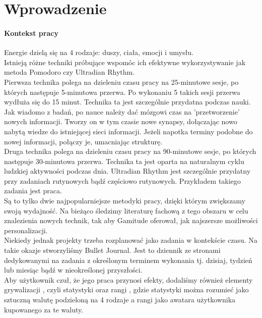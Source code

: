 \documentclass[a4paper,11pt]{report}
\begin{document}
\chapter{Wprowadzenie}
\subsubsection{Kontekst pracy}
Energie\cite{Harward} dzielą się na 4 rodzaje: duszy, ciała, emocji i umysłu.
\\Istnieją różne techniki próbujące wspomóc ich efektywne wykorzystywanie jak metoda Pomodoro\cite{Pomodoro}\cite{pomodoro_} czy Ultradian Rhythm\cite{90/30}\cite{ultradianRhytm1}\cite{ultradianRhytm2}\cite{ultradianRhytm3}.
\\Pierwsza technika polega na dzieleniu czasu pracy na 25-minutowe sesje, po których następuje 5-minutowa przerwa.
 Po wykonaniu 5 takich sesji przerwa wydłuża się do 15 minut.
 Technika ta jest szczególnie przydatna podczas nauki.
\\Jak wiadomo z badań, po nauce należy dać mózgowi czas na 'przetworzenie' nowych informacji.
 Tworzy on w tym czasie nowe synapsy, dołączając nowo nabytą wiedze do istniejącej sieci informacji.
 Jeżeli napotka terminy podobne do nowej informacji, połączy je,  umacniając strukturę. 
\\Druga technika polega na dzieleniu czasu pracy na 90-minutowe sesje, po których następuje 30-minutowa przerwa.
 Technika ta jest oparta na naturalnym cyklu ludzkiej aktywności podczas dnia.
 Ultradian Rhythm jest szczególnie przydatny przy zadaniach rutynowych bądź częściowo rutynowych.
 Przykładem takiego zadania jest praca.
\\Są to tylko dwie najpopularniejsze metodyki pracy, dzięki którym zwiększamy swoją wydajność. 
Na bieżąco śledzimy literaturę fachową z tego obszaru w celu znalezienia nowych technik,
 tak aby Gamitude oferował, jak najszersze możliwości personalizacji. 
\\Niekiedy jednak projekty trzeba rozplanować jako zadania w kontekście czasu.
 Na takie okazje stworzyliśmy Bullet Journal\cite{bulletJournal}.
 Jest to dziennik ze stronami dedykowanymi na zadania z określonym terminem wykonania tj. dzisiaj, tydzień lub miesiąc bądź w nieokreślonej przyszłości.
\\Aby użytkownik czuł, że jego praca przynosi efekty, dodaliśmy również elementy grywalizacji \cite{grywalizacja}, czyli 
 statystyki oraz rangi \cite{rangi}, gdzie statystyki można rozumieć jako sztuczną walutę podzieloną na 4 rodzaje a rangi 
 jako awatara użytkownika kupowanego za te waluty.
\end{document}
